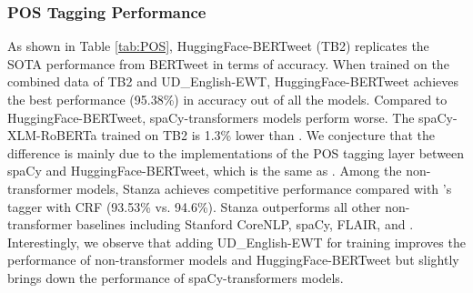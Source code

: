 \documentclass[10pt, a4paper]{article}
\begin{document}
\subsubsection{POS Tagging Performance}
As shown in Table \ref{tab:POS}, HuggingFace-BERTweet (TB2) replicates the SOTA performance from BERTweet \cite{nguyen2020bertweet} in terms of accuracy. When trained on the combined data of TB2 and UD\_English-EWT, HuggingFace-BERTweet achieves the best performance (95.38\%) in accuracy out of all the models. Compared to HuggingFace-BERTweet, spaCy-transformers models perform worse. The spaCy-XLM-RoBERTa trained on TB2 is 1.3\% lower than . We conjecture that the difference is mainly due to the implementations of the POS tagging layer between spaCy and HuggingFace-BERTweet, which is the same as . Among the non-transformer models, Stanza achieves competitive performance compared with 's tagger with CRF (93.53\% vs. 94.6\%). Stanza outperforms all other non-transformer baselines including Stanford CoreNLP, spaCy, FLAIR, and . Interestingly, we observe that adding UD\_English-EWT for training improves the performance of non-transformer models and HuggingFace-BERTweet but slightly brings down the performance of spaCy-transformers models. 
\end{document}
